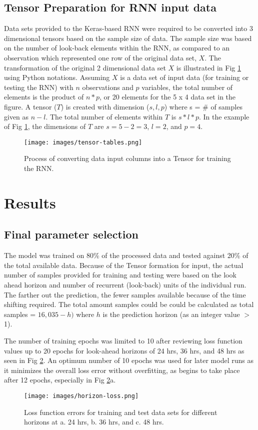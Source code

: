 \documentclass[preprint,12pt,authoryear]{elsarticle}
\begin{document}
\begin{linenumbers}
\subsection{Tensor Preparation for RNN input data}
Data sets provided to the Keras-based RNN were required to be converted into 3 dimensional tensors based on the sample size of data. The sample size was based on the number of look-back elements within the RNN, as compared to an observation which represented one row of the original data set, $X$.  The transformation of the original 2 dimensional data set $X$ is illustrated in Fig \ref{fig:tensor-tables} using Python notations. Assuming $X$ is a data set of input data (for training or testing the RNN) with $n$ observations and $p$ variables, the total number of elements is the product of $n * p$, or 20 elements for the 5 x 4 data set in the figure. A tensor ($T$) is created with dimension ($s, l, p$) where s = \# of samples given as $n - l$. The total number of elements within $T$ is $s*l*p$. In the example of Fig \ref{fig:tensor-tables}, the dimensions of $T$ are $s = 5 - 2 = 3$, $l = 2$, and $p = 4$.    
%
\begin{figure}[H]
\centering
\texttt{[image: images/tensor-tables.png]}  %
\caption{Process of converting data input columns into a Tensor for training the RNN.}
\label{fig:tensor-tables}
\end{figure}
%

\section{Results}
\subsection{Final parameter selection}
The model was trained on 80\% of the processed data and tested against 20\% of the total available data. Because of the Tensor formation for input, the actual number of samples provided for training and testing were based on the look ahead horizon and number of recurrent (look-back) units of the individual run. The farther out the prediction, the fewer samples available because of the time shifting required. The total amount samples could be could be calculated as total samples = $16,035 - h)$ where $h$ is the prediction horizon (as an integer value $>$ 1). 

The number of training epochs was limited to 10 after reviewing loss function values up to 20 epochs for look-ahead horizons of 24 hrs, 36 hrs, and 48 hrs as seen in Fig \ref{fig:horizon-loss}. An optimum number of 10 epochs was used for later model runs as it minimizes the overall loss error without overfitting, as begins to take place after 12 epochs, especially in Fig \ref{fig:horizon-loss}a. 
%
\begin{figure}[H]
\centering
\texttt{[image: images/horizon-loss.png]}  %
\caption{Loss function errors for training and test data sets for different horizons at a. 24 hrs, b. 36 hrs, and c. 48 hrs.}
\label{fig:horizon-loss}
\end{figure}
%


\end{linenumbers}
\end{document}
